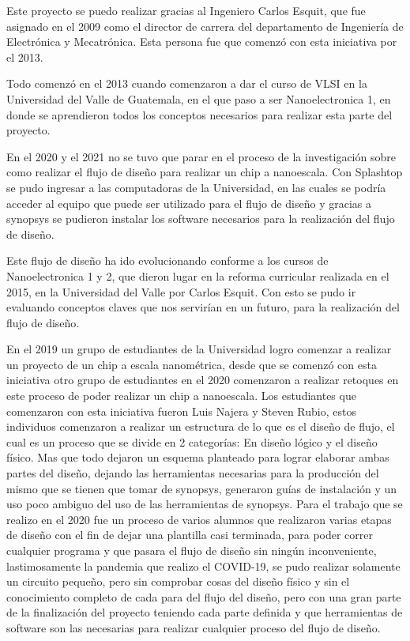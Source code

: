 

Este proyecto se puedo realizar gracias al Ingeniero Carlos Esquit, que fue asignado en el 2009 como el director de carrera del departamento de Ingeniería de Electrónica y Mecatrónica. Esta persona fue que comenzó con esta iniciativa por el 2013.

Todo comenzó en el 2013 cuando comenzaron a dar el curso de VLSI en la Universidad del Valle de Guatemala, en el que paso a ser Nanoelectronica 1, en donde se aprendieron todos los conceptos necesarios para realizar esta parte del proyecto. 


En el 2020 y el 2021 no se tuvo que parar en el proceso de la investigación sobre como realizar el flujo de diseño para realizar un chip a nanoescala. Con Splashtop se pudo ingresar a las computadoras de la Universidad, en las cuales se podría acceder al equipo que puede ser utilizado para el flujo de diseño y gracias a synopsys se pudieron instalar los software necesarios para la realización del flujo de diseño.

Este flujo de diseño ha ido evolucionando conforme a los cursos de Nanoelectronica 1 y 2, que dieron lugar en la reforma curricular realizada en el 2015, en la Universidad del Valle por Carlos Esquit. Con esto se pudo ir evaluando conceptos claves que nos servirían en un futuro, para la realización del flujo de diseño.


En el 2019 un grupo de estudiantes de la Universidad logro comenzar a realizar un proyecto de un chip a escala nanométrica, desde que se comenzó con esta iniciativa otro grupo de estudiantes en el 2020 comenzaron a realizar retoques en este proceso de poder realizar un chip a nanoescala.
Los estudiantes que comenzaron con esta iniciativa fueron Luis Najera y Steven Rubio, estos individuos comenzaron a realizar un estructura de lo que es el diseño de flujo, el cual es un proceso que se divide en 2 categorías: En diseño lógico y el diseño físico. Mas que todo dejaron un esquema planteado para lograr elaborar ambas partes del diseño, dejando las herramientas necesarias para la producción del mismo que se tienen que tomar de synopsys, generaron guías de instalación y un uso poco ambiguo del uso de las herramientas de synopsys.
Para el trabajo que se realizo en el 2020 fue un proceso de varios alumnos que realizaron varias etapas de diseño con el fin de dejar una plantilla casi terminada, para poder correr cualquier programa y que pasara el flujo de diseño sin ningún inconveniente, lastimosamente la pandemia que realizo el COVID-19, se pudo realizar solamente un circuito pequeño, pero sin comprobar cosas del diseño físico y sin el conocimiento completo de cada para del flujo del diseño, pero con una gran parte de la finalización del proyecto teniendo cada parte definida y que herramientas de software son las necesarias para realizar cualquier proceso del flujo de diseño.




\cite{hoover2010bio} \cite{park2014design}